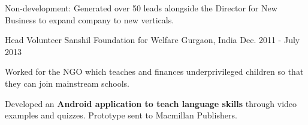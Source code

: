 \begin{cventries}
{\begin{cvitems}
       \item {Non-development: Generated over 50 leads alongside the Director for New Business to expand company to new verticals.}
      \end{cvitems}
    }
  \cventry
    {Head Volunteer}
    {Sanshil Foundation for Welfare}
    {Gurgaon, India}
    {Dec. 2011 - July 2013}
    {
      \begin{cvitems}
        \item {Worked for the NGO which teaches and finances underprivileged children so that they can join mainstream schools.}
        \item {Developed an \textbf{Android application to teach language skills} through video examples and quizzes. Prototype sent to Macmillan Publishers.}
      \end{cvitems} 
    }
\end{cventries}